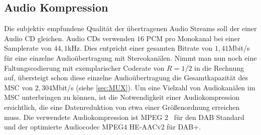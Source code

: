 \subsection{Audio Kompression}
Die subjektiv empfundene Qualität der übertragenen Audio Streams soll der einer Audio CD gleichen. Audio CDs verwenden $16$ PCM pro Monokanal bei einer Samplerate von $44,1$kHz. Dies entpricht einer gesamten Bitrate von $1,41$Mbit/s für eine einzelne Audioübertragung mit Stereokanälen. Nimmt man nun noch eine Faltungscodierung mit exemplarischer Coderate von $R=1/2$ in die Rechnung auf, übersteigt schon diese einzelne Audioübertragung die Gesamtkapazität des \ac{MSC} von $2,304$Mbit/s (siehe \ref{sec:MUX}). Um eine Vielzahl von Audiokanälen im \ac{MSC} unterbringen zu können, ist die Notwendigkeit einer Audiokompression ersichtlich, die eine Datenreduktion von etwa einer Größenordnung erreichen muss. Die verwendete Audiokompression ist \ac{MPEG 2}~\cite{etsi:mp2} für den DAB Standard und der optimierte Audiocodec MPEG4 HE-AACv2 für DAB+.\\

